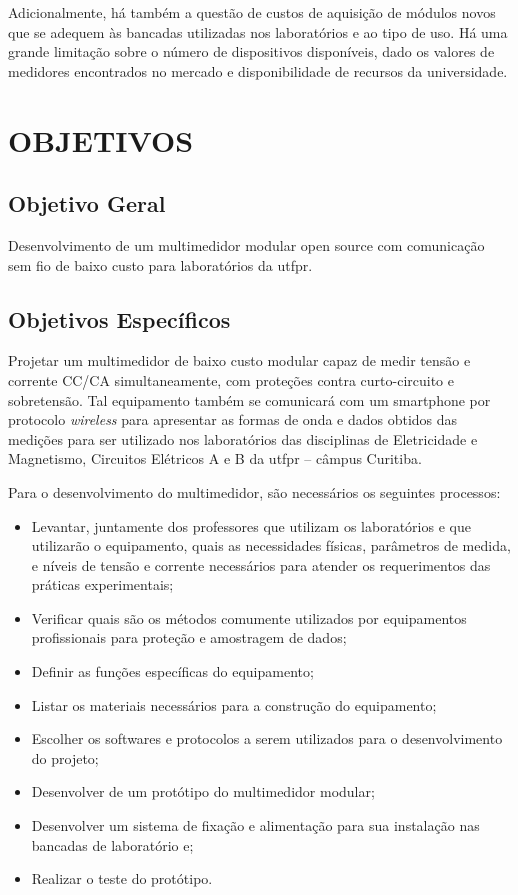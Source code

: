 Adicionalmente, há também a questão de custos de aquisição de módulos novos que se adequem às bancadas utilizadas nos laboratórios e ao tipo de uso. Há uma grande limitação sobre o número de dispositivos disponíveis, dado os valores de medidores encontrados no mercado e disponibilidade de recursos da universidade.

\section{OBJETIVOS}\label{sec:objetivos}

\subsection{Objetivo Geral}\label{sec:objgeral}
Desenvolvimento de um multimedidor modular open source com comunicação sem fio de baixo custo para laboratórios da \gls{utfpr}.


\subsection{Objetivos Específicos}\label{sec:objespec}
Projetar um multimedidor de baixo custo modular capaz de medir tensão e corrente \gls{CC}/\gls{CA} simultaneamente, com proteções contra curto-circuito e sobretensão. Tal equipamento também se comunicará com um smartphone por protocolo \textit{wireless} para apresentar as formas de onda e dados obtidos das medições para ser utilizado nos laboratórios das disciplinas de Eletricidade e Magnetismo, Circuitos Elétricos A e B da \gls{utfpr} – câmpus Curitiba.

Para o desenvolvimento do multimedidor, são necessários os seguintes processos:

\begin{itemize}
    \item Levantar, juntamente dos professores que utilizam os laboratórios e que utilizarão o equipamento, quais as necessidades físicas, parâmetros de medida, e níveis de tensão e corrente necessários para atender os requerimentos das práticas experimentais;
    \item Verificar quais são os métodos comumente utilizados por equipamentos profissionais para proteção e amostragem de dados;
    \item Definir as funções específicas do equipamento;
    \item Listar os materiais necessários para a construção do equipamento;
    \item Escolher os softwares e protocolos a serem utilizados para o desenvolvimento do projeto;
    \item Desenvolver de um protótipo do multimedidor modular;
    \item Desenvolver um sistema de fixação e alimentação para sua instalação nas bancadas de laboratório e;
    \item Realizar o teste do protótipo.
\end{itemize}

